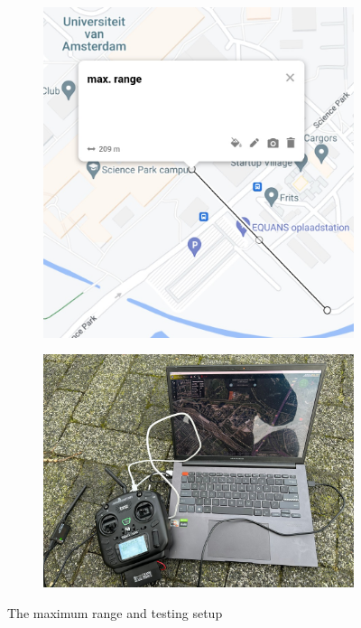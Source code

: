 \begin{figure}
\centering
\begin{subfigure}{.5\textwidth}
  \centering
  \includegraphics[width=.8\linewidth]{images/range_test.jpg}
  \label{fig:maxrange}
\end{subfigure}%
\begin{subfigure}{.5\textwidth}
  \centering
  \includegraphics[width=.8\linewidth]{images/range_test2.jpg}
  \label{fig:rangesetup}
\end{subfigure}
\caption{The maximum range and testing setup}
\label{fig:range}
\end{figure}
